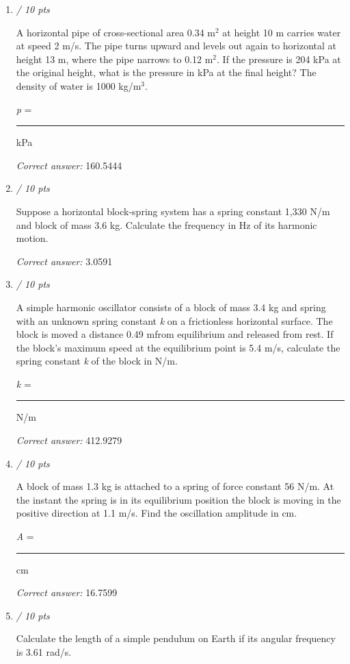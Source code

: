 \documentclass[11pt]{article}
\begin{document}
\begin{enumerate}[leftmargin=*,label=\textbf{Question \arabic*.}]
\textit{Correct answer: } 5.7918

\item \hfill \textit{/ 10 pts}

A horizontal pipe of cross-sectional area 0.34 m$^{2}$ at height 10 m carries water at speed 2 m/s. The pipe turns upward and levels out again to horizontal at height 13 m, where the pipe narrows to 0.12 m$^{2}$. If the pressure is 204 kPa at the original height, what is the pressure in kPa at the final height? The density of water is 1000 kg/m$^{3}$.



\emph{p} = \rule{2cm}{0.4pt} kPa

\textit{Correct answer: } 160.5444

\item \hfill \textit{/ 10 pts}

Suppose a horizontal block-spring system has a spring constant 1,330 N/m and block of mass 3.6 kg. Calculate the frequency in Hz of its harmonic motion.

\textit{Correct answer: } 3.0591

\item \hfill \textit{/ 10 pts}

A simple harmonic oscillator consists of a block of mass 3.4 kg and spring with an unknown spring constant \emph{k} on a frictionless horizontal surface. The block is moved a distance 0.49 mfrom equilibrium and released from rest. If the block's maximum speed at the equilibrium point is 5.4 m/s, calculate the spring constant \emph{k} of the block in N/m.



\emph{k} = \rule{2cm}{0.4pt} N/m

\textit{Correct answer: } 412.9279

\item \hfill \textit{/ 10 pts}

A block of mass 1.3 kg is attached to a spring of force constant 56 N/m. At the instant the spring is in its equilibrium position the block is moving in the positive direction at 1.1 m/s. Find the oscillation amplitude in cm.



\emph{A }= \rule{2cm}{0.4pt} cm

\textit{Correct answer: } 16.7599

\item \hfill \textit{/ 10 pts}

Calculate the length of a simple pendulum on Earth if its angular frequency is 3.61 rad/s.




\end{enumerate}
\end{document}
